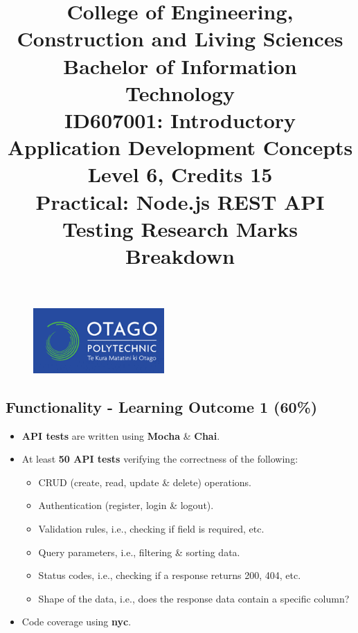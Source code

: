 \documentclass{article}
\author{}
\begin{document}
\begin{figure}
  \centering
  \includegraphics[width=50mm]{../img/logo.png}
\end{figure}

\title{College of Engineering, Construction and Living Sciences\\Bachelor of Information Technology\\ID607001: Introductory Application Development Concepts\\Level 6, Credits 15\\\textbf{Practical: Node.js REST API Testing Research Marks Breakdown}}
\date{}
\maketitle

\subsection*{Functionality - Learning Outcome 1 (60\%)}
\begin{itemize}
  \item \textbf{API tests} are written using \textbf{Mocha} \& \textbf{Chai}.
  \item At least \textbf{50 API tests} verifying the correctness of the following:
        \begin{itemize}
          \item CRUD (create, read, update \& delete) operations.
          \item Authentication (register, login \& logout).
          \item Validation rules, i.e., checking if field is required, etc.
          \item Query parameters, i.e., filtering \& sorting data.
          \item Status codes, i.e., checking if a response returns 200, 404, etc.
          \item Shape of the data, i.e., does the response data contain a specific column?
        \end{itemize}
  \item Code coverage using \textbf{nyc}.
\end{itemize}
\end{document}
